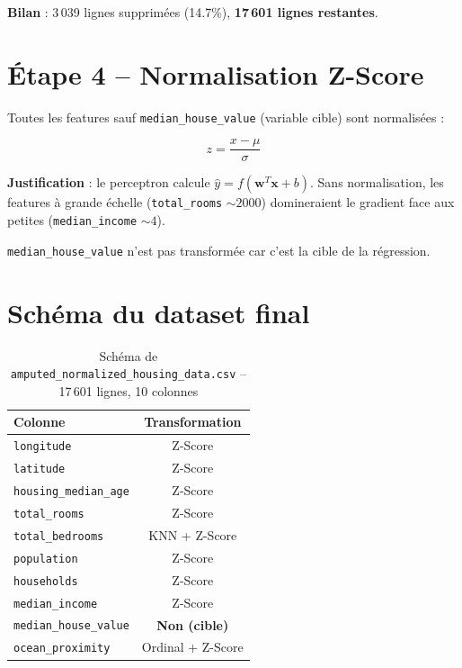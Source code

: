 \documentclass[a4paper,11pt]{article}
\begin{document}
\textbf{Bilan} : 3\,039 lignes supprim\'ees (14.7\%), \textbf{17\,601 lignes restantes}.

\section{\'Etape 4 -- Normalisation Z-Score}

Toutes les features sauf \texttt{median\_house\_value} (variable cible) sont normalis\'ees :

\begin{equation}
z = \frac{x - \mu}{\sigma}
\end{equation}

\textbf{Justification} : le perceptron calcule $\hat{y} = f(\mathbf{w}^T \mathbf{x} + b)$. Sans normalisation, les features \`a grande \'echelle (\texttt{total\_rooms} $\sim 2000$) domineraient le gradient face aux petites (\texttt{median\_income} $\sim 4$).

\texttt{median\_house\_value} n'est pas transform\'ee car c'est la cible de la r\'egression.

\section{Sch\'ema du dataset final}

\begin{table}[h]
\centering
\begin{tabular}{lc}
\toprule
\textbf{Colonne} & \textbf{Transformation} \\
\midrule
\texttt{longitude}            & Z-Score \\
\texttt{latitude}             & Z-Score \\
\texttt{housing\_median\_age} & Z-Score \\
\texttt{total\_rooms}         & Z-Score \\
\texttt{total\_bedrooms}      & KNN + Z-Score \\
\texttt{population}           & Z-Score \\
\texttt{households}           & Z-Score \\
\texttt{median\_income}       & Z-Score \\
\texttt{median\_house\_value} & \textbf{Non (cible)} \\
\texttt{ocean\_proximity}     & Ordinal + Z-Score \\
\bottomrule
\end{tabular}
\caption{Sch\'ema de \texttt{amputed\_normalized\_housing\_data.csv} -- 17\,601 lignes, 10 colonnes}
\end{table}
\end{document}
